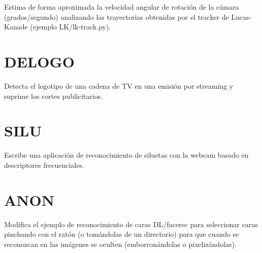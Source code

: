 \documentclass[a4paper]{article} %
\begin{document}
\begin{tcolorbox}[breakable,notitle,boxrule=0pt,colback=lightgray,colframe=lightgray]
	Estima de forma aproximada la velocidad angular de rotación de la cámara (grados/segundo) analizando las trayectorias obtenidas por el tracker de Lucas-Kanade (ejemplo LK/lk-track.py).
\end{tcolorbox}

\newpage


\section{DELOGO}
\bigskip

\begin{tcolorbox}[breakable,notitle,boxrule=0pt,colback=lightgray,colframe=lightgray]
	Detecta el logotipo de una cadena de TV en una emisión por streaming y suprime los cortes publicitarios.
\end{tcolorbox}

\newpage


\section{SILU}
\bigskip

\begin{tcolorbox}[breakable,notitle,boxrule=0pt,colback=lightgray,colframe=lightgray]
	Escribe una aplicación de reconocimiento de siluetas con la webcam basado en descriptores frecuenciales.
\end{tcolorbox}

\newpage


\section{ANON}
\bigskip

\begin{tcolorbox}[breakable,notitle,boxrule=0pt,colback=lightgray,colframe=lightgray]
	Modifica el ejemplo de reconocimiento de caras DL/facerec para seleccionar caras pinchando con el ratón (o tomándolas de un directorio) para que cuando se reconozcan en las imágenes se oculten (emborronándolas o pixelizándolas).
\end{tcolorbox}
\end{document}
